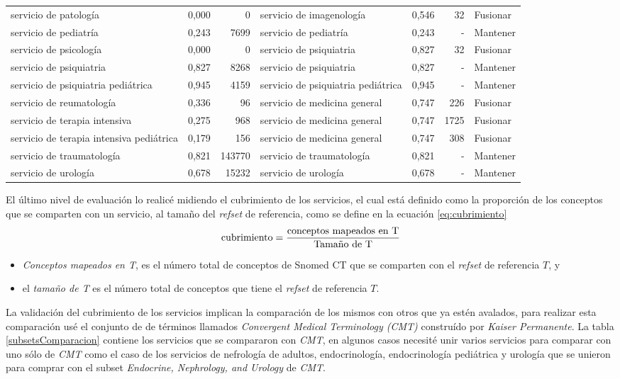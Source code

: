 \begin{table}[htb]
{\begin{tabular}{@{}lrrlrrl@{}}
servicio de patología & 0,000 & 0 & servicio de imagenología & 0,546 & 32 & Fusionar \\
servicio de pediatría & 0,243 & 7699 & servicio de pediatría & 0,243 & - & Mantener \\
servicio de psicología & 0,000 & 0 & servicio de psiquiatria & 0,827 & 32 & Fusionar \\
servicio de psiquiatria & 0,827 & 8268 & servicio de psiquiatria & 0,827 & - & Mantener \\
servicio de psiquiatria pediátrica & 0,945 & 4159 & servicio de psiquiatria pediátrica & 0,945 & - & Mantener \\
servicio de reumatología & 0,336 & 96 & servicio de medicina general & 0,747 & 226 & Fusionar \\
servicio de terapia intensiva & 0,275 & 968 & servicio de medicina general & 0,747 & 1725 & Fusionar \\
servicio de terapia intensiva pediátrica & 0,179 & 156 & servicio de medicina general & 0,747 & 308 & Fusionar \\
servicio de traumatología & 0,821 & 143770 & servicio de traumatología & 0,821 & - & Mantener \\
servicio de urología & 0,678 & 15232 & servicio de urología & 0,678 & - & Mantener \\ \bottomrule
\end{tabular}%
}
\end{table}

El último nivel de evaluación lo realicé midiendo el cubrimiento de los servicios\cite{Yu2012ClinicalSNOMED-CT}, el cual está definido como la proporción de los conceptos que se comparten con un servicio, al tamaño del \textit{refset} de referencia, como se define en la ecuación \ref{eq:cubrimiento}
\begin{equation}\label{eq:cubrimiento}
\textup{cubrimiento} = \frac{\textup{conceptos mapeados en T}}{\textup{Tamaño de T}}
\end{equation}

\begin{itemize}
\item \textit{Conceptos mapeados en T}, es el número total de conceptos de Snomed CT que se comparten con el \textit{refset} de referencia $T$, y
\item el \textit{tamaño de T} es el número total de conceptos que tiene el \textit{refset} de referencia $T$.
\end{itemize}

La validación del cubrimiento de los servicios implican la comparación de los mismos con otros que ya estén avalados, para realizar esta comparación usé el conjunto de de términos llamados \textit{Convergent Medical Terminology (CMT) }construído por \textit{Kaiser Permanente}. La tabla \ref{subsetsComparacion} contiene los servicios que se compararon con \textit{CMT}, en algunos casos necesité unir varios servicios para comparar con uno sólo de \textit{CMT} como el caso de los servicios de nefrología de adultos, endocrinología, endocrinología pediátrica y urología que se unieron para comprar con el subset \textit{Endocrine, Nephrology, and Urology} de \textit{CMT}.

